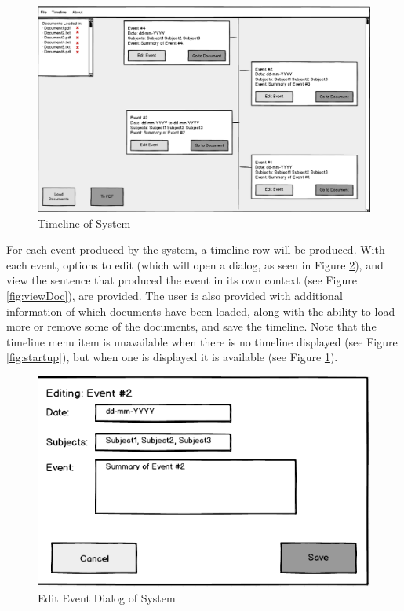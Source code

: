 \begin{figure}[H]
\caption{Timeline of System}
\label{fig:timeline}
\includegraphics[width=\linewidth]{timeline.png}
\centering
\end{figure}
\par For each event produced by the system, a timeline row will be produced. With each event, options to edit (which will open a dialog, as seen in Figure \ref{fig:editDialog}), and view the sentence that produced the event in its own context (see Figure \ref{fig:viewDoc}), are provided. The user is also provided with additional information of which documents have been loaded, along with the ability to load more or remove some of the documents, and save the timeline. Note that the timeline menu item is unavailable when there is no timeline displayed (see Figure \ref{fig:startup}), but when one is displayed it is available (see Figure \ref{fig:timeline}).
\begin{figure}[H]
\caption{Edit Event Dialog of System}
\label{fig:editDialog}
\includegraphics[scale=0.6]{editDialog.png}
\centering
\end{figure}

